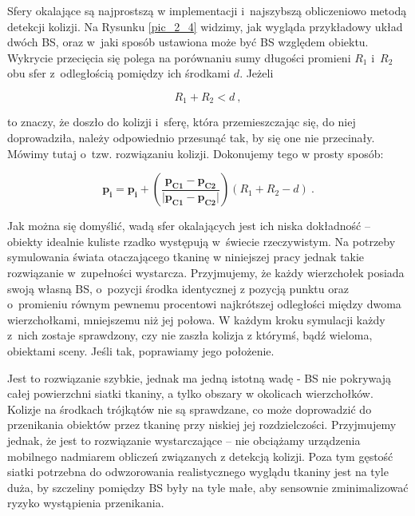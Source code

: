 				
				Sfery okalające są najprostszą w implementacji i~najszybszą obliczeniowo metodą detekcji kolizji. Na Rysunku \ref{pic_2_4} widzimy, jak wygląda przykładowy układ dwóch BS, oraz w~jaki sposób ustawiona może być BS względem obiektu. Wykrycie przecięcia się polega na porównaniu sumy długości promieni \(R_{1}\) i~\(R_{2}\) obu sfer z~odległością pomiędzy ich środkami \(d\). Jeżeli
				
				\begin{equation}
				R_{1} + R_{2} < d \ ,
				\end{equation}
				
				to znaczy, że doszło do kolizji i~sferę, która przemieszczając się, do niej doprowadziła, należy odpowiednio przesunąć tak, by się one nie przecinały. Mówimy tutaj o~tzw. rozwiązaniu kolizji. Dokonujemy tego w prosty sposób:
				
				\begin{equation}
				\mathbf{p_{i}} = \mathbf{p_{i}} + (\frac{\mathbf{p_{C1}} - \mathbf{p_{C2}}}{|\mathbf{p_{C1}} - \mathbf{p_{C2}|}})(R_{1} + R_{2} - d) \ .
				\end{equation}
				
				Jak można się domyślić, wadą sfer okalających jest ich niska dokładność -- obiekty idealnie kuliste rzadko występują w~świecie rzeczywistym. Na potrzeby symulowania świata otaczającego tkaninę w niniejszej pracy jednak takie rozwiązanie w~zupełności wystarcza. Przyjmujemy, że każdy wierzchołek posiada swoją własną BS, o~pozycji środka identycznej z pozycją punktu oraz o~promieniu równym pewnemu procentowi najkrótszej odległości między dwoma wierzchołkami, mniejszemu niż jej połowa. W każdym kroku symulacji każdy z~nich zostaje sprawdzony, czy nie zaszła kolizja z którymś, bądź wieloma, obiektami sceny. Jeśli tak, poprawiamy jego położenie. 
				
				Jest to rozwiązanie szybkie, jednak ma jedną istotną wadę - BS nie pokrywają całej powierzchni siatki tkaniny, a tylko obszary w okolicach wierzchołków. Kolizje na środkach trójkątów nie są sprawdzane, co może doprowadzić do przenikania obiektów przez tkaninę przy niskiej jej rozdzielczości. Przyjmujemy jednak, że jest to rozwiązanie wystarczające -- nie obciążamy urządzenia mobilnego nadmiarem obliczeń związanych z detekcją kolizji. Poza tym gęstość siatki potrzebna do odwzorowania realistycznego wyglądu tkaniny jest na tyle duża, by szczeliny pomiędzy BS były na tyle małe, aby sensownie zminimalizować ryzyko wystąpienia przenikania.
				
